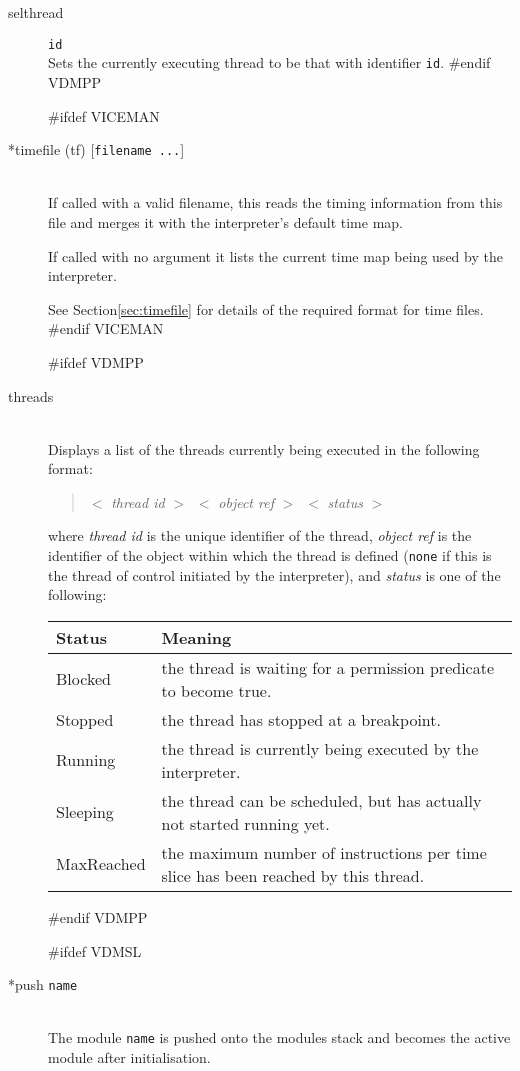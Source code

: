 \documentclass[\pformat,12pt]{article}
\begin{document}
\begin{description}
\item[selthread]\texttt{id}\mbox{}\\
  Sets the currently executing thread to be that with identifier
  \texttt{id}.
#endif VDMPP

#ifdef VICEMAN
\item[*timefile (tf) \mbox{[{\tt filename ...}]}] \mbox{}\\
  If called with a valid filename, this reads the timing information
  from this file and merges it with the interpreter's default time
  map.

  If called with no argument it lists the current time map being
  used by the interpreter.
  
  See Section\ref{sec:timefile} for details of the required
  format for time files.
#endif VICEMAN

#ifdef VDMPP
\item[threads]\mbox{}\\
  Displays a list of the threads currently being executed in the
following format:

\begin{quote}
  $<$ \textit{thread id} $>$\ $<$ \textit{object ref} $>$\ $<$
\textit{status} $>$
\end{quote}

where \textit{thread id} is the unique identifier of the thread,
\textit{object ref} is the identifier of the object within which the
thread is defined (\texttt{none} if this is the thread of control
initiated by the interpreter), and \textit{status} is one of the
following:

\begin{tabular}{lp{10cm}}\hline
Status & Meaning \\ \hline
Blocked    & the thread is waiting for a permission predicate to
             become true. \\ 
Stopped    & the thread has stopped at a breakpoint.\\
Running    & the thread is currently being executed by the
interpreter. \\
Sleeping   & the thread can be
scheduled, but has actually not started running yet.\\
MaxReached & the maximum number of instructions per time slice has
              been reached by this thread. \\ \hline 
\end{tabular}
#endif VDMPP

#ifdef VDMSL
\item[*push {\tt name}] \mbox{}\\
  The module {\tt name}\/ is pushed onto the modules stack and becomes
  the active module after initialisation.
  

\end{description}
\end{document}
